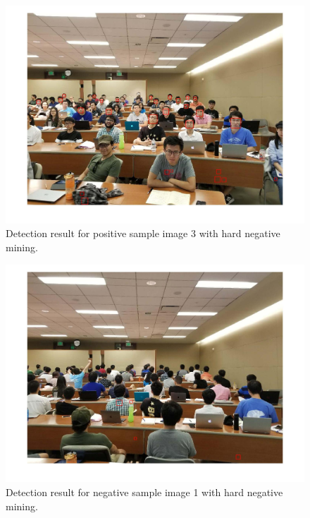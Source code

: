 \documentclass[10pt]{article}
\begin{document}
	\newpage\begin{figure}[ht]
		\includegraphics[width=\textwidth]{detection_face_3_hard_neg.jpg}
		\centering
		\caption{Detection result for positive sample image 3 with hard negative mining.}
		\label{16}
	\end{figure}
	\newpage\begin{figure}[ht]
		\includegraphics[width=\textwidth]{detection_nonface_1_hard_neg.jpg}
		\centering
		\caption{Detection result for negative sample image 1 with hard negative mining.}
		\label{17}
	\end{figure}
\end{document}
